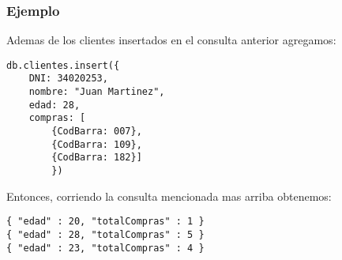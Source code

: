 \subsubsection{Ejemplo}
Ademas de los clientes insertados en el consulta anterior agregamos:

\begin{lstlisting}
db.clientes.insert({
	DNI: 34020253,
	nombre: "Juan Martinez",
	edad: 28,
	compras: [
		{CodBarra: 007},
		{CodBarra: 109},
		{CodBarra: 182}]
		})
\end{lstlisting}

Entonces, corriendo la consulta mencionada mas arriba obtenemos:

\begin{lstlisting}
{ "edad" : 20, "totalCompras" : 1 }
{ "edad" : 28, "totalCompras" : 5 }
{ "edad" : 23, "totalCompras" : 4 }
\end{lstlisting}
